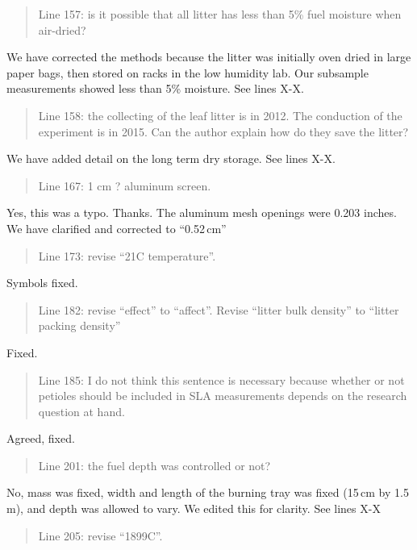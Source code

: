 \documentclass[letterpaper, 12pt]{letter}
\begin{document}
\begin{letter}{}
\begin{quote}
Line 157: is it possible that all litter has less than 5\% fuel moisture when air-dried?
\end{quote}

We have corrected the methods because the litter was initially oven dried in large paper bags, then stored on racks in the low humidity lab. Our subsample measurements showed less than 5\% moisture.  See lines X-X.

\begin{quote}
Line 158: the collecting of the leaf litter is in 2012. The conduction of the experiment is in 2015. Can the author explain how do they save the litter?
\end{quote}

We have added detail on the long term dry storage. See lines X-X.

\begin{quote}
Line 167: 1 cm ? aluminum screen.
\end{quote}

Yes, this was a typo. Thanks. The aluminum mesh openings were 0.203 inches. We have clarified and corrected to ``0.52\,cm'' 

\begin{quote}
Line 173: revise “21C temperature”.
\end{quote}

Symbols fixed.

\begin{quote}
Line 182: revise “effect” to “affect”. 	Revise “litter bulk density” to “litter packing density”
\end{quote}

Fixed.

\begin{quote}
Line 185: I do not think this sentence is necessary because whether or not petioles should be included in SLA measurements depends on the research question at hand.
\end{quote}

Agreed, fixed.

\begin{quote}
Line 201: the fuel depth was controlled or not?
\end{quote}

No, mass was fixed, width and length of the burning tray was fixed (15\,cm by 1.5\,m), and depth was allowed to vary.  We edited this for clarity. See lines X-X

\begin{quote}
Line 205: revise “1899C”.
\end{quote}



\end{letter}
\end{document}
